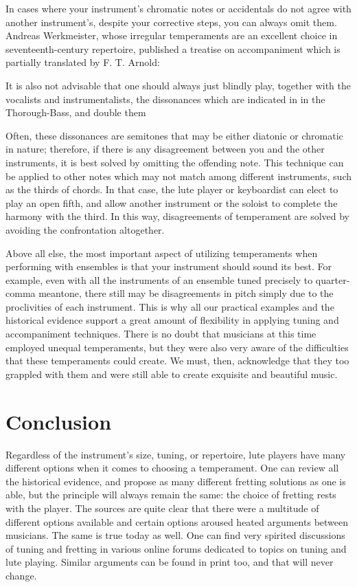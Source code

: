 In cases where your instrument's chromatic notes or accidentals do not agree with another
instrument's, despite your corrective steps, you can always omit them. Andreas
Werkmeister, whose irregular temperaments are an excellent choice in seventeenth-century repertoire,
published a treatise on accompaniment which is partially translated by F. T. Arnold:
\begin{blocks}
It is also not advisable that one should always just blindly play, together with the vocalists
and instrumentalists, the dissonances which are indicated in in the Thorough-Bass, and double
them
\autocite[210]{FTA:1}
\end{blocks}
Often, these dissonances are semitones that may be either diatonic or chromatic
in nature; therefore, if there is any disagreement between you and the other
instruments, it is best solved by omitting the offending note. This technique
can be applied to other notes which may not match among different
instruments, such as the thirds of chords.  In that case, the lute player or
keyboardist can elect to play an open fifth, and allow another instrument or the
soloist to complete the harmony with the third.  In this way, disagreements of
temperament are solved by avoiding the confrontation altogether.

Above all else, the most important aspect of utilizing temperaments when performing with ensembles
is that your instrument should sound its best. For example, even with all the instruments of an ensemble tuned
precisely to quarter-comma meantone, there still may be disagreements in pitch simply due to the
proclivities of each instrument. This is why all our practical examples and the historical evidence
support a great amount of flexibility in applying tuning and accompaniment techniques. There is no
doubt that musicians at this time employed unequal temperaments, but they were also very aware of
the difficulties that these temperaments could create.  We must, then, acknowledge that they too
grappled with them and were still able to create exquisite and beautiful music.

\section{Conclusion}

Regardless of the instrument's size, tuning, or repertoire, lute players have many different options
when it comes to choosing a temperament.  One can review all the historical evidence, and propose as
many different fretting solutions as one is able, but the principle will always remain the same: the
choice of fretting rests with the player. The sources are quite clear that there were a
multitude of different options available and certain options aroused heated arguments between
musicians. The same is true today as well. One can find very spirited discussions of tuning and
fretting in various online forums dedicated to topics on tuning and lute playing. Similar arguments
can be found in print too, and that will never change. \autocite{DD:4}

